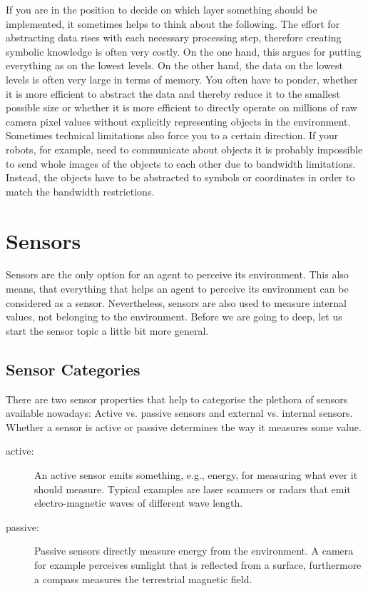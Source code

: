 If you are in the position to decide on which layer something should be implemented, it sometimes helps to think about the following. The effort for abstracting data rises with each necessary processing step, therefore creating symbolic knowledge is often very costly. On the one hand, this argues for putting everything as on the lowest levels. On the other hand, the data on the lowest levels is often very large in terms of memory. You often have to ponder, whether it is more efficient to abstract the data and thereby reduce it to the smallest possible size or whether it is more efficient to directly operate on millions of raw camera pixel values without explicitly representing objects in the environment. Sometimes technical limitations also force you to a certain direction. If your robots, for example, need to communicate about objects it is probably impossible to send whole images of the objects to each other due to bandwidth limitations. Instead, the objects have to be abstracted to symbols or coordinates in order to match the bandwidth restrictions.

\section{Sensors}
\label{sec:sensor}

Sensors are the only option for an agent to perceive its environment. This also means, that everything that helps an agent to perceive its environment can be considered as a sensor. Nevertheless, sensors are also used to measure internal values, not belonging to the environment. Before we are going to deep, let us start the sensor topic a little bit more general.

\subsection{Sensor Categories}
\label{ssec:sensorcategories}

There are two sensor properties that help to categorise the plethora of sensors available nowadays: Active vs. passive sensors and external vs. internal sensors. Whether a sensor is active or passive determines the way it measures some value.

\begin{description}
 \item [active:] An active sensor emits something, e.g., energy, for measuring what ever it should measure. Typical examples are laser scanners or radars that emit electro-magnetic waves of different wave length.
 \item [passive:] Passive sensors directly measure energy from the environment. A camera for example perceives sunlight that is reflected from a surface, furthermore a compass measures the terrestrial magnetic field.
\end{description}

